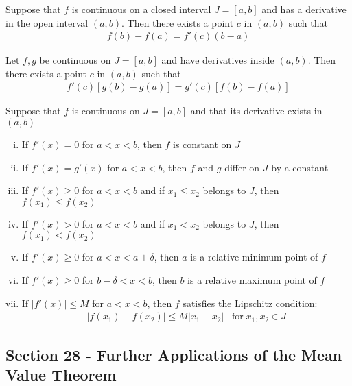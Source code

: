 \documentclass[12pt]{article}
\newenvironment{theorem}[2][Theorem]{\begin{trivlist}
\item[\hskip \labelsep {\bfseries #1}\hskip \labelsep {\bfseries #2.}]}{\end{trivlist}}
\begin{document}
\begin{theorem}[Mean Value]{Theorem}
Suppose that $f$ is continuous on a closed interval $J = [a, b]$ and has a derivative in the open interval $(a, b)$. Then there exists a point $c$ in $(a, b)$ such that
\begin{align*}
f(b) - f(a) = f'(c)(b - a)
\end{align*}
\end{theorem}

\begin{theorem}[Cauchy Mean Value]{Theorem}
Let $f, g$ be continuous on $J = [a, b]$ and have derivatives inside $(a, b)$. Then there exists a point $c$ in $(a, b)$ such that
\begin{align*}
f'(c)[g(b) - g(a)] = g'(c)[f(b) - f(a)]
\end{align*}
\end{theorem}

\begin{theorem}{27.9}
Suppose that $f$ is continuous on $J = [a, b]$ and that its derivative exists in $(a, b)$
\begin{enumerate}[i)]
\item If $f'(x) = 0$ for $a < x < b$, then $f$ is constant on $J$
\item If $f'(x) = g'(x)$ for $a < x < b$, then $f$ and $g$ differ on $J$ by a constant
\item If $f'(x) \geq 0$ for $a < x < b$ and if $x_1 \leq x_2$ belongs to $J$, then $f(x_1) \leq f(x_2)$
\item If $f'(x) > 0$ for $a < x < b$ and if $x_1 < x_2$ belongs to $J$, then $f(x_1) < f(x_2)$
\item If $f'(x) \geq 0$ for $a < x < a + \delta$, then $a$ is a relative minimum point of $f$
\item If $f'(x) \geq 0$ for $b - \delta < x < b$, then $b$ is a relative maximum point of $f$
\item If $|f'(x)| \leq M$ for $a < x < b$, then $f$ satisfies the Lipschitz condition:
\begin{align*}
|f(x_1) - f(x_2)| \leq M|x_1 - x_2| \; \; \; \text{for} \; x_1, x_2 \in J
\end{align*}
\end{enumerate}
\end{theorem}

\subsection*{Section 28 - Further Applications of the Mean Value Theorem}
\end{document}
